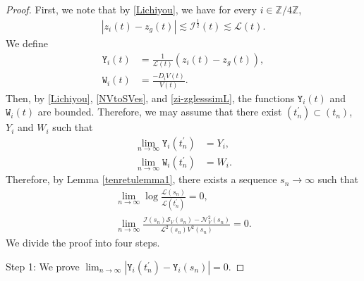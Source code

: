 \documentclass[reqno]{amsart}
\theoremstyle{plain}
\theoremstyle{definition}
\numberwithin{equation}{section}
\begin{document}
\begin{proof}
First, we note that by \eqref{Lichiyou}, we have for every $i\in\mathbb{Z}/4\mathbb{Z}$,
\begin{align}\label{zi-zglesssimL}
\left|z_i(t)-z_g(t)\right|\lesssim \mathcal{I}^{\frac{1}{2}}(t)\lesssim \mathcal{L}(t).
\end{align}
We define
\begin{align}
\mathtt{Y}_i(t)&=\frac{1}{\mathcal{L}(t)}\left(z_i(t)-z_g(t)\right),
\\
\mathtt{W}_i(t)&=\frac{-D_iV(t)}{V(t)}.
\end{align}
Then, by \eqref{Lichiyou}, \eqref{NVtoSVes}, and \eqref{zi-zglesssimL}, the functions $\mathtt{Y}_i(t)$ and $\mathtt{W}_i(t)$ are bounded. Therefore, we may assume that there exist $(t_n^{\prime})\subset (t_n)$, $Y_i$ and $W_i$ such that 
\begin{align*}
\lim_{n\to\infty} \mathtt{Y}_i(t_n^{\prime})&=Y_i,
\\
\lim_{n\to\infty}\mathtt{W}_i(t_n^{\prime})&=W_i.
\end{align*}
Therefore, by Lemma \ref{tenretulemma1}, there exists a sequence $s_n\to\infty$ such that 
\begin{align*}
\lim_{n\to\infty}\log{\frac{\mathcal{L}(s_n)}{\mathcal{L}(t_n^{\prime})}}=0,
\\
\lim_{n\to\infty}\frac{\mathcal{I}(s_n)\mathcal{S}_V(s_n)-\mathcal{N}_V^2(s_n)}{\mathcal{L}^2(s_n)V^2(s_n)}=0.
\end{align*}
We divide the proof into four steps.

Step 1: We prove $\lim_{n\to\infty} \left|\mathtt{Y}_i(t_n^{\prime})-\mathtt{Y}_i(s_n)\right|=0$. 


\end{proof}
\end{document}
